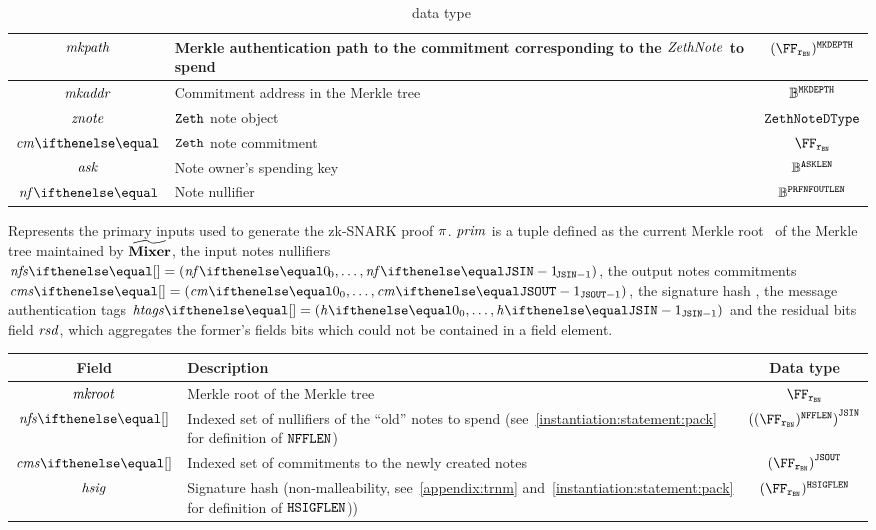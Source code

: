 \begin{description}
\begin{table}[H]
\begin{tabular}{cp{20em}c}
            $\mathit{mkpath}$ & Merkle authentication path to the commitment corresponding to the $\mathit{ZethNote}$ to spend & $(\FFx{\rBN})^{\mkTreeDepth}$ \\ \midrule
            $\mathit{mkaddr}$ & Commitment address in the Merkle tree & $\mathbb{B}^{\mathtt{MKDEPTH}}$\\ \midrule
            $\mathit{znote}$ & $\texttt{Zeth}{}$ note object & ${\mathtt{ZethNoteDType}}$ \\ \midrule
            $\cm{}$ & $\texttt{Zeth}{}$ note commitment & $\FFx{\rBN}$ \\ \midrule
            $\mathit{ask}$ & Note owner's spending key & $\mathbb{B}^{\mathtt{ASKLEN}}$\\ \midrule
            $\nf{}$ & Note nullifier & $\mathbb{B}^{\mathtt{PRFNFOUTLEN}}$\\ \bottomrule
        \end{tabular}
        \caption{\jsInputDType~data type}\label{zeth-protocol:tab:jsinput}
        \end{table}
    \item[\primInputDType]
    Represents the primary inputs used to generate the zk-SNARK proof $\mathit{\pi}$. $\mathit{prim}$ is a tuple defined as the current Merkle root \mkroot~of the Merkle tree maintained by $\widetilde{\mathbf{Mixer}}$, the input notes nullifiers $\nfs{} = \smalltuple{\nf{0}, \ldots, \nf{\jsin - 1}}$, the output notes commitments $\cms{} = \smalltuple{\cm{0}, \ldots, \cm{\jsout - 1}}$, the signature hash \hsig, the message authentication tags $\htags{} = \smalltuple{\htag{0}, \ldots, \htag{\jsin-1}}$ and the residual bits field $\mathit{rsd}$, which aggregates the former's fields bits which could not be contained in a field element.
        \begin{table}[H]
        \centering
        \begin{tabular}{cp{20em}c}
            Field & Description & Data type\\ \toprule
            $\mathit{mkroot}$ & Merkle root of the Merkle tree & $\FFx{\rBN}$ \\ \midrule
            $\nfs{}$ & Indexed set of nullifiers of the ``old'' notes to spend (see~\cref{instantiation:statement:pack} for definition of $\mathtt{NFFLEN}$) & ${((\FFx{\rBN})^{\nfFLen})}^{\jsin}$\\ \midrule
            $\cms{}$ & Indexed set of commitments to the newly created notes & ${(\FFx{\rBN})}^{\jsout}$\\ \midrule
            $\mathit{hsig}$ & Signature hash (non-malleability, see~\cref{appendix:trnm} and~\cref{instantiation:statement:pack} for definition of $\mathtt{HSIGFLEN}$)) & $(\FFx{\rBN})^{\hsigFLen}$\\ \midrule

\end{tabular}
\end{table}
\end{description}

